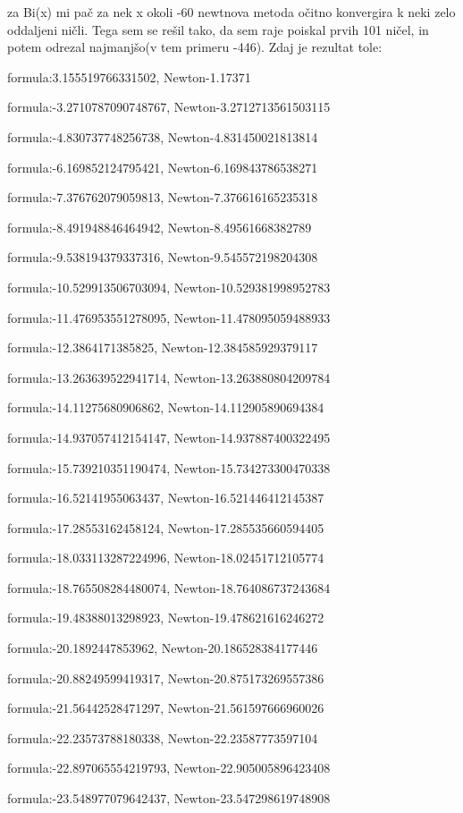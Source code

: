\documentclass{article}
\begin{document}
za Bi(x) mi pač za nek x okoli -60 newtnova metoda očitno konvergira k neki zelo oddaljeni ničli. Tega sem se rešil tako, da sem raje poiskal prvih 101 ničel, in potem odrezal najmanjšo(v tem primeru -446). Zdaj je rezultat tole:

formula:3.155519766331502, Newton-1.17371

formula:-3.2710787090748767, Newton-3.2712713561503115

formula:-4.830737748256738, Newton-4.831450021813814

formula:-6.169852124795421, Newton-6.169843786538271

formula:-7.376762079059813, Newton-7.376616165235318

formula:-8.491948846464942, Newton-8.49561668382789

formula:-9.538194379337316, Newton-9.545572198204308

formula:-10.529913506703094, Newton-10.529381998952783

formula:-11.476953551278095, Newton-11.478095059488933

formula:-12.3864171385825, Newton-12.384585929379117

formula:-13.263639522941714, Newton-13.263880804209784

formula:-14.11275680906862, Newton-14.112905890694384

formula:-14.937057412154147, Newton-14.937887400322495

formula:-15.739210351190474, Newton-15.734273300470338

formula:-16.52141955063437, Newton-16.521446412145387

formula:-17.28553162458124, Newton-17.285535660594405

formula:-18.033113287224996, Newton-18.02451712105774

formula:-18.765508284480074, Newton-18.764086737243684

formula:-19.48388013298923, Newton-19.478621616246272

formula:-20.1892447853962, Newton-20.186528384177446

formula:-20.88249599419317, Newton-20.875173269557386

formula:-21.56442528471297, Newton-21.561597666960026

formula:-22.23573788180338, Newton-22.23587773597104

formula:-22.897065554219793, Newton-22.905005896423408

formula:-23.548977079642437, Newton-23.547298619748908
\end{document}
